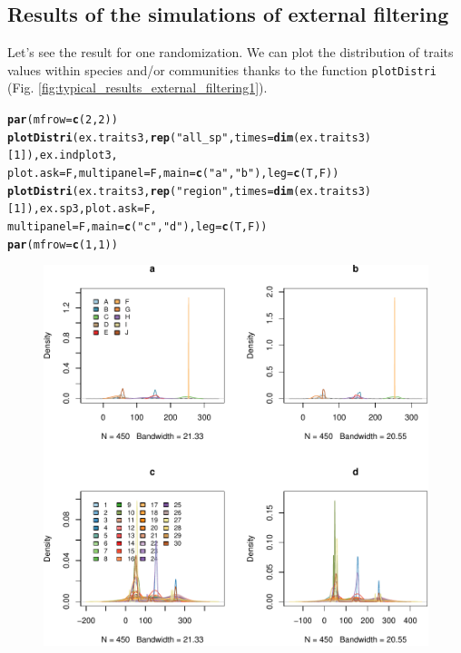 \documentclass[12pt]{article}\usepackage[]{graphicx}\usepackage[]{color}
\makeatletter
\def\maxwidth{ %
  \ifdim\Gin@nat@width>\linewidth
    \linewidth
  \else
    \Gin@nat@width
  \fi
}
\newcommand{\hlnum}[1]{\textcolor[rgb]{0.686,0.059,0.569}{#1}}%
\newcommand{\hlstr}[1]{\textcolor[rgb]{0.192,0.494,0.8}{#1}}%
\newcommand{\hlstd}[1]{\textcolor[rgb]{0.345,0.345,0.345}{#1}}%
\newcommand{\hlkwc}[1]{\textcolor[rgb]{0.333,0.667,0.333}{#1}}%
\newcommand{\hlkwd}[1]{\textcolor[rgb]{0.737,0.353,0.396}{\textbf{#1}}}%
\newenvironment{kframe}{%
 \def\at@end@of@kframe{}%
 \ifinner\ifhmode%
  \def\at@end@of@kframe{\end{minipage}}%
  \begin{minipage}{\columnwidth}%
 \fi\fi%
 \def\FrameCommand##1{\hskip\@totalleftmargin \hskip-\fboxsep
 \colorbox{shadecolor}{##1}\hskip-\fboxsep
     \hskip-\linewidth \hskip-\@totalleftmargin \hskip\columnwidth}%
 \MakeFramed {\advance\hsize-\width
   \@totalleftmargin\z@ \linewidth\hsize
   \@setminipage}}%
 {\par\unskip\endMakeFramed%
 \at@end@of@kframe}
\newenvironment{knitrout}{}{} %
\makeatother
\begin{document}
 \subsection {Results of the simulations of external filtering}

Let's see the result for one randomization. We can plot the distribution of traits values within species and/or communities thanks to the function \texttt{plotDistri} (Fig. \ref{fig:typical_results_external_filtering1}). 

\begin{knitrout}\small
{}\color{fgcolor}\begin{kframe}
\begin{alltt}
\hlkwd{par}\hlstd{(}\hlkwc{mfrow}\hlstd{=}\hlkwd{c}\hlstd{(}\hlnum{2}\hlstd{,} \hlnum{2}\hlstd{))}
\hlkwd{plotDistri}\hlstd{(ex.traits3,} \hlkwd{rep}\hlstd{(}\hlstr{"all_sp"}\hlstd{,} \hlkwc{times} \hlstd{=} \hlkwd{dim}\hlstd{(ex.traits3)[}\hlnum{1}\hlstd{]), ex.indplot3,}
           \hlkwc{plot.ask} \hlstd{= F,} \hlkwc{multipanel} \hlstd{= F,} \hlkwc{main} \hlstd{=} \hlkwd{c}\hlstd{(}\hlstr{"a"}\hlstd{,} \hlstr{"b"}\hlstd{),} \hlkwc{leg} \hlstd{=} \hlkwd{c}\hlstd{(T, F))}
\hlkwd{plotDistri}\hlstd{(ex.traits3,} \hlkwd{rep}\hlstd{(}\hlstr{"region"}\hlstd{,} \hlkwc{times} \hlstd{=} \hlkwd{dim}\hlstd{(ex.traits3)[}\hlnum{1}\hlstd{]), ex.sp3,} \hlkwc{plot.ask} \hlstd{= F,}
           \hlkwc{multipanel} \hlstd{= F,} \hlkwc{main} \hlstd{=} \hlkwd{c}\hlstd{(}\hlstr{"c"}\hlstd{,} \hlstr{"d"}\hlstd{),} \hlkwc{leg} \hlstd{=} \hlkwd{c}\hlstd{(T, F))}
\hlkwd{par}\hlstd{(}\hlkwc{mfrow}\hlstd{=}\hlkwd{c}\hlstd{(}\hlnum{1}\hlstd{,} \hlnum{1}\hlstd{))}
\end{alltt}
\end{kframe}\begin{figure}

{\centering \includegraphics[width=\maxwidth]{figure/typical_results_external_filtering1-1} 

}
\end{figure}
\end{knitrout}
\end{document}
